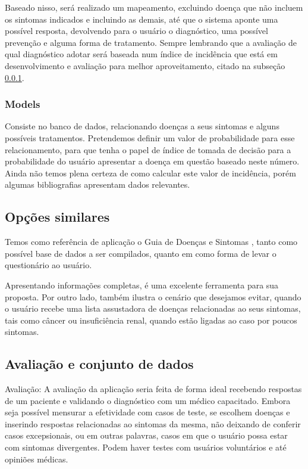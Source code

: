 Baseado nisso, será realizado um mapeamento, excluindo doença que não incluem os sintomas indicados e incluindo as demais, até que o sistema aponte uma possível resposta, devolvendo para o usuário o diagnóstico, uma possível prevenção e alguma forma de tratamento.
Sempre lembrando que a avaliação de qual diagnóstico adotar será baseada num índice de incidência que está em desenvolvimento e avaliação para melhor aproveitamento, citado na subseção \ref{ssec:models}.

\subsubsection{Models}\label{ssec:models}

Consiste no banco de dados, relacionando doenças a seus sintomas e alguns possíveis tratamentos.
Pretendemos definir um valor de probabilidade para esse relacionamento, para que tenha o papel de índice de tomada de decisão para a probabilidade do usuário apresentar a doença em questão baseado neste número.
Ainda não temos plena certeza de como calcular este valor de incidência, porém algumas bibliografias apresentam dados relevantes\cite{AlbertEinstein, longo2011harrison}.

\subsection{Opções similares}

Temos como referência de aplicação o Guia de Doenças e Sintomas \cite{AlbertEinstein}, tanto como possível base de dados a ser compilados, quanto em como forma de levar o questionário ao usuário.

Apresentando informações completas, é uma excelente ferramenta para sua proposta.
Por outro lado, também ilustra o cenário que desejamos evitar, quando o usuário recebe uma lista assustadora de doenças relacionadas ao seus sintomas, tais como câncer ou insuficiência renal, quando estão ligadas ao caso por poucos sintomas.

\subsection{Avaliação e conjunto de dados}

Avaliação: A avaliação da aplicação seria feita de forma ideal recebendo respostas de um paciente e validando o diagnóstico com um médico capacitado. Embora seja possível mensurar a efetividade com casos de teste, se escolhem doenças e inserindo respostas relacionadas ao sintomas da mesma, não deixando de conferir casos excepsionais, ou  em outras palavras, casos em que o usuário possa estar com sintomas divergentes.
Podem haver testes com usuários voluntários e até opiniões médicas.

